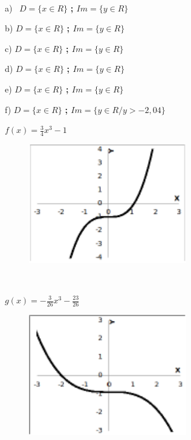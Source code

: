 \begin{respostas}{4}
~~

	\ansitem{} a)~ \( D= \{ x \in R \}  \) \textbf{;  \( Im= \{ y \in R \}  \) }

	b)  \( D= \{ x \in R \}  \) \textbf{;  \( Im= \{ y \in R \}  \) }

	c)  \( D= \{ x \in R \}  \) \textbf{;  \( Im= \{ y \in R \}  \) }

	d)  \( D= \{ x \in R \}  \) \textbf{;  \( Im= \{ y \in R \}  \) }

	e)  \( D= \{ x \in R \}  \) \textbf{;  \( Im= \{ y \in R \}  \) }

	f)  \( D= \{ x \in R \}  \) \textbf{;  \( Im= \{ y \in R/y>-2,04 \}  \) }

	\ansitem{}  \( f \left( x \right) =\frac{3}{4}x^3-1 \) 

	\begin{figure}[H]
		\begin{Center}
			\includegraphics[width=2.71in,height=2.04in]{capitulos/outras_funcoes/media/image66.pdf}
		\end{Center}
	\end{figure}

~~

	\ansitem{}  \( g \left( x \right) =-\frac{3}{26}x^{3}-\frac{23}{26} \) 

	\begin{figure}[H]
		\begin{Center}
			\includegraphics[width=2.71in,height=2.08in]{capitulos/outras_funcoes/media/image67.pdf}
		\end{Center}
	\end{figure}


\end{respostas}
